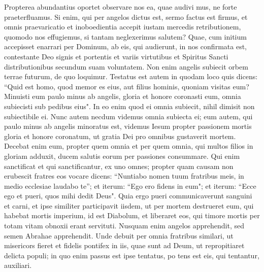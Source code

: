 \begin{biblechapter} 
\verse Propterea abundantius oportet observare nos ea, quae audivi mus, ne forte praeterfluamus. 
\verse Si enim, qui per angelos dictus est, sermo factus est firmus, et omnis praevaricatio et inoboedientia accepit iustam mercedis retributionem, 
\verse quomodo nos effugiemus, si tantam neglexerimus salutem? Quae, cum initium accepisset enarrari per Dominum, ab eis, qui audierunt, in nos confirmata est, 
\verse contestante Deo signis et portentis et variis virtutibus et Spiritus Sancti distributionibus secundum suam voluntatem. 
\verse Non enim angelis subiecit orbem terrae futurum, de quo loquimur. 
\verse Testatus est autem in quodam loco quis dicens: “Quid est homo, quod memor es eius, aut filius hominis, quoniam visitas eum? 
\verse Minuisti eum paulo minus ab angelis, gloria et honore coronasti eum, 
\verse omnia subiecisti sub pedibus eius". In eo enim quod ei omnia subiecit, nihil dimisit non subiectibile ei. Nunc autem necdum videmus omnia subiecta ei; 
\verse eum autem, qui paulo minus ab angelis minoratus est, videmus Iesum propter passionem mortis gloria et honore coronatum, ut gratia Dei pro omnibus gustaverit mortem. 
\verse Decebat enim eum, propter quem omnia et per quem omnia, qui multos filios in gloriam adduxit, ducem salutis eorum per passiones consummare. 
\verse Qui enim sanctificat et qui sanctificantur, ex uno omnes; propter quam causam non erubescit fratres eos vocare 
\verse dicens: “Nuntiabo nomen tuum fratribus meis, in medio ecclesiae laudabo te”; 
\verse et iterum: “Ego ero fidens in eum"; et iterum: “Ecce ego et pueri, quos mihi dedit Deus". 
\verse Quia ergo pueri communicaverunt sanguini et carni, et ipse similiter participavit iisdem, ut per mortem destrueret eum, qui habebat mortis imperium, id est Diabolum, 
\verse et liberaret eos, qui timore mortis per totam vitam obnoxii erant servituti. 
\verse Nusquam enim angelos apprehendit, sed semen Abrahae apprehendit. 
\verse Unde debuit per omnia fratribus similari, ut misericors fieret et fidelis pontifex in iis, quae sunt ad Deum, ut repropitiaret delicta populi; 
\verse in quo enim passus est ipse tentatus, po tens est eis, qui tentantur, auxiliari.  
\end{biblechapter}

